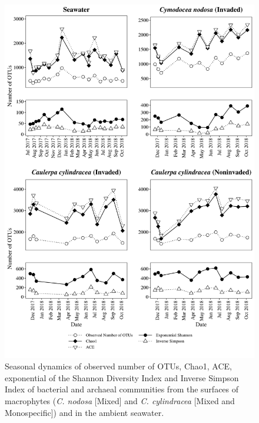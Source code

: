 \documentclass[12pt,]{article}
\begin{document}
\begin{figure}[H]

{\centering \includegraphics[width=0.85\linewidth]{../results/figures/calculators} 

}

\caption{Seasonal dynamics of observed number of OTUs, Chao1, ACE, exponential of the Shannon Diversity Index and Inverse Simpson Index of bacterial and archaeal communities from the surfaces of macrophytes (\textit{C. nodosa} [Mixed] and \textit{C. cylindracea} [Mixed and Monospecific]) and in the ambient seawater.\label{calculators}}\label{fig:unnamed-chunk-2}
\end{figure}
\end{document}
